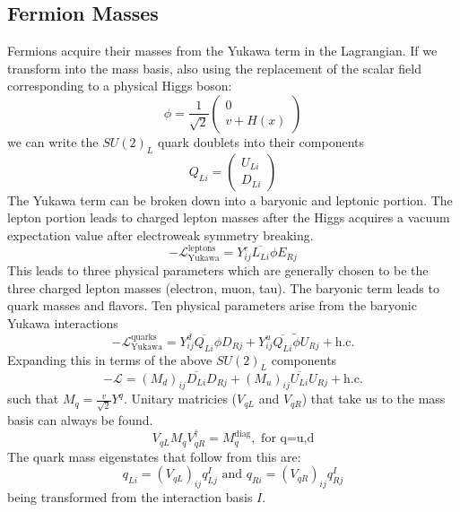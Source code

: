\subsection{Fermion Masses}
Fermions acquire their masses from the Yukawa term in the Lagrangian.  If we transform into the mass basis, also using the replacement of the scalar field corresponding to a physical Higgs boson:
\[ \phi=\frac{1}{\sqrt{2}}\begin{pmatrix}0\\v+H(x)\end{pmatrix} \]
we can write the $SU(2)_L$ quark doublets into their components \[Q_{Li}=\begin{pmatrix}U_{Li}\\D_{Li}\end{pmatrix}\]
The Yukawa term can be broken down into a baryonic and leptonic portion.  The lepton portion leads to charged lepton masses after the Higgs acquires a vacuum expectation value after electroweak symmetry breaking.
\[ -\mathcal{L}^\text{leptons}_\text{Yukawa} = Y_{ij}^e \overline{L_{Li}}\phi E_{Rj} \]
This leads to three physical parameters which are generally chosen to be the three charged lepton masses (electron, muon, tau).  The baryonic term leads to quark masses and flavors. Ten physical parameters arise from the baryonic Yukawa interactions  
\[ -\mathcal{L}^{\text{quarks}}_\text{Yukawa} = Y_{ij}^d \overline{Q_{Li}} \phi D_{Rj} + Y_{ij}^u \overline{Q_{Li}} \tilde{\phi}U_{Rj} + \text{h.c.}\]
Expanding this in terms of the above $SU(2)_L$ components
\[-\mathcal{L}=(M_d)_{ij}\overline{D_{Li}} D_{Rj} +(M_u)_{ij}\overline{U_{Li}}U_{Rj} +\text{h.c.} \]
such that $M_q = \frac{v}{\sqrt{2}}Y^q$.  Unitary matricies ($V_{qL}$ and $V_{qR}$) that take us to the mass basis can always be found. 
\[V_{qL} M_q V_{qR}^{\dagger} =M_q^\text{diag}, \text{  for q=u,d} \]
The quark mass eigenstates that follow from this are: \[q_{Li}=(V_{qL})_{ij}q_{Lj}^I \text{  and  } q_{Ri} = (V_{qR})_{ij}q_{Rj}^I \] being transformed from the interaction basis $I$.

